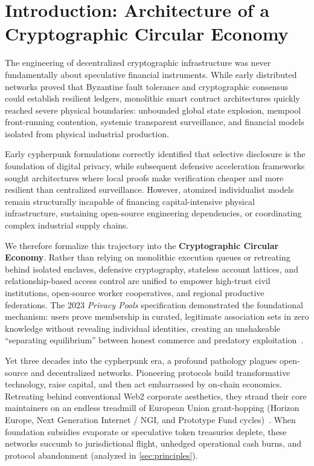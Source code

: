 \documentclass[a4paper,11pt,twoside,parskip=half-,headings=small]{scrartcl}
\begin{document}
\tableofcontents
\clearpage


\section{Introduction: Architecture of a Cryptographic Circular Economy}
\label{sec:intro}

The engineering of decentralized cryptographic infrastructure was never fundamentally about speculative financial instruments. While early distributed networks proved that Byzantine fault tolerance and cryptographic consensus could establish resilient ledgers, monolithic smart contract architectures quickly reached severe physical boundaries: unbounded global state explosion, mempool front-running contention, systemic transparent surveillance, and financial models isolated from physical industrial production.

Early cypherpunk formulations correctly identified that selective disclosure is the foundation of digital privacy, while subsequent defensive acceleration frameworks sought architectures where local proofs make verification cheaper and more resilient than centralized surveillance. However, atomized individualist models remain structurally incapable of financing capital-intensive physical infrastructure, sustaining open-source engineering dependencies, or coordinating complex industrial supply chains.

We therefore formalize this trajectory into the \textbf{Cryptographic Circular Economy}. Rather than relying on monolithic execution queues or retreating behind isolated enclaves, defensive cryptography, stateless account lattices, and relationship-based access control are unified to empower high-trust civil institutions, open-source worker cooperatives, and regional productive federations. The 2023 \emph{Privacy Pools}
specification demonstrated the foundational mechanism: users prove membership in curated,
legitimate association sets in zero knowledge without revealing individual identities,
creating an unshakeable ``separating equilibrium'' between honest commerce and predatory
exploitation~\cite{buterin2023privacypools}.

Yet three decades into the cypherpunk era, a profound pathology plagues open-source
and decentralized networks. Pioneering protocols build transformative technology,
raise capital, and then act embarrassed by on-chain economics. Retreating behind
conventional Web2 corporate aesthetics, they strand their core maintainers on
an endless treadmill of European Union grant-hopping (Horizon Europe, Next Generation
Internet / NGI, and Prototype Fund cycles)~\cite{ngireport2023}. When foundation
subsidies evaporate or speculative token treasuries deplete, these networks succumb to
jurisdictional flight, unhedged operational cash burns, and protocol abandonment
(analyzed in \cref{sec:principles}).
\end{document}
